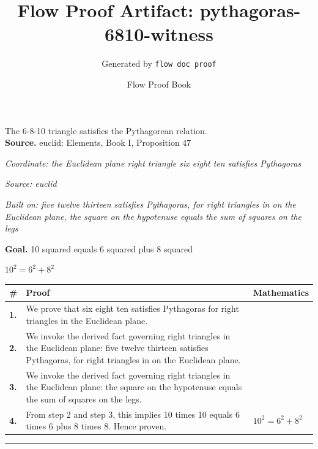 \documentclass[11pt]{article}
\title{Flow Proof Artifact: pythagoras-6810-witness}
\author{Generated by \texttt{flow doc proof}}
\date{Flow Proof Book}
\theoremstyle{definition}
\begin{document}
\maketitle
The 6-8-10 triangle satisfies the Pythagorean relation.\\[0.5em]
\textbf{Source.} euclid: Elements, Book I, Proposition 47\\[0.5em]
\bigskip
{}\par
\smallskip\noindent\textit{Coordinate: the Euclidean plane \cdot right triangle \cdot six eight ten satisfies Pythagoras}\par
\smallskip\noindent\textit{Source: euclid}\par
\smallskip\noindent\textit{Built on: five twelve thirteen satisfies Pythagoras, for right triangles in on the Euclidean plane, the square on the hypotenuse equals the sum of squares on the legs}\par
\medskip
\noindent\textbf{Goal.} 10 squared equals 6 squared plus 8 squared\par
\noindent$\displaystyle 10^{2} = 6^{2} + 8^{2}$\par
\medskip
\noindent
\begin{tabular}{@{} >{\raggedright\arraybackslash}p{} >{\raggedright\arraybackslash}p{} >{\raggedleft\arraybackslash}p{} @{}}
\textbf{\#} & \textbf{Proof} & \textbf{Mathematics} \\
\midrule
\textbf{1.} & We prove that six eight ten satisfies Pythagoras for right triangles in the Euclidean plane. & \\[0.45em]
\textbf{2.} & We invoke the derived fact governing right triangles in the Euclidean plane: five twelve thirteen satisfies Pythagoras, for right triangles in on the Euclidean plane. & \\[0.45em]
\textbf{3.} & We invoke the derived fact governing right triangles in the Euclidean plane: the square on the hypotenuse equals the sum of squares on the legs. & \\[0.45em]
\textbf{4.} & From step 2 and step 3, this implies 10 times 10 equals 6 times 6 plus 8 times 8. Hence proven. & $\displaystyle 10^{2} = 6^{2} + 8^{2}$ \\[0.45em]
\bottomrule
\end{tabular}
\label{thm:Geometry-right triangle-six_eight_ten_satisfies_pythagoras}
\par\medskip\hrule
\end{document}
